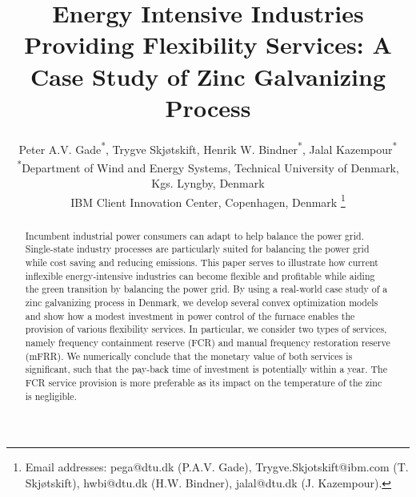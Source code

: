 \documentclass[conference]{IEEEtran}
\begin{document}
\title{Energy Intensive Industries Providing Flexibility Services: A  Case Study of Zinc Galvanizing Process}

\author{Peter A.V. Gade\textsuperscript{*}\textsuperscript{\textdagger}, Trygve Skjøtskift\textsuperscript{\textdagger}, Henrik W. Bindner\textsuperscript{*}, Jalal Kazempour\textsuperscript{*} \\
    \textsuperscript{*}Department of Wind and Energy Systems, Technical University of Denmark, Kgs. Lyngby, Denmark \\
    \textsuperscript{\textdagger}IBM Client Innovation Center, Copenhagen, Denmark
    \thanks{
        Email addresses: pega@dtu.dk (P.A.V. Gade), Trygve.Skjotskift@ibm.com (T. Skjøtskift), hwbi@dtu.dk (H.W. Bindner), jalal@dtu.dk (J. Kazempour).}%

    \vspace{-3mm}
}

\maketitle

\IEEEaftertitletext{\vspace{-0.8\baselineskip}}
\maketitle
\thispagestyle{plain}
\pagestyle{plain}

\begin{abstract}
    Incumbent industrial power consumers can adapt to help balance the power grid. Single-state industry processes are particularly suited for balancing the power grid while cost saving and reducing emissions. This paper serves to illustrate how current inflexible energy-intensive industries can become flexible and profitable while aiding the green transition by balancing the power grid. By using a real-world case study of a zinc galvanizing process in Denmark, we develop several convex optimization models and show how a modest investment in power control of the furnace enables the provision of various flexibility services. In particular, we consider two types of services, namely frequency containment reserve (FCR) and manual frequency restoration reserve (mFRR). We numerically conclude that the monetary value of both services is significant, such that the pay-back time of investment is potentially within a year. The FCR service provision is more preferable as its impact on the temperature of the zinc is negligible.
\end{abstract}
\end{document}
